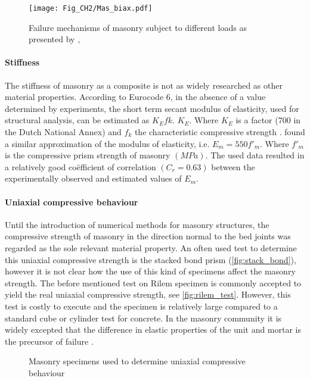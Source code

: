 \begin{figure}[!htb]
    \centering
    \texttt{[image: Fig\_CH2/Mas\_biax.pdf]}
    \caption{Failure mechanisms of masonry subject to different loads as presented by \citet{Mersch2015}, \cite{Dhanasekar1985}}
    \label{fig:Mas_biax}
\end{figure}

\paragraph{Stiffness}
The stiffness of masonry as a composite is not as widely researched as other material properties. According to Eurocode 6, in the absence of a value determined by experiments, the short term secant modulus of elasticity, used for structural analysis, can be estimated as $K_{E}f{k}$. $K_{E}$. Where $K_{E}$ is a factor (700 in the Dutch National Annex) and $f_{k}$ the characteristic compressive strength \cite[\S 3.7.2]{en1996}. \citet{kaushik2007} found a similar approximation of the modulus of elasticity, i.e. $E_{m}=550f'_{m}$. Where $f'_{m}$ is the compressive prism strength of masonry $(MPa)$. The used data resulted in a relatively good co\"{e}fficient of correlation $(C_{r}=0.63)$ between the experimentally observed and estimated values of $E_{m}$.

\paragraph{Uniaxial compressive behaviour}
Until the introduction of numerical methods for masonry structures, the compressive strength of masonry in the direction normal to the bed joints was regarded as the sole relevant material property. An often used test to determine this uniaxial compressive strength is the stacked bond prism (\autoref{fig:stack_bond}), however it is not clear how the use of this kind of specimens affect the masonry strength. The before mentioned test on Rilem specimen is commonly accepted to yield the real uniaxial compressive strength, see \autoref{fig:rilem_test}. However, this test is costly to execute and the specimen is relatively large compared to a standard cube or cylinder test for concrete. In the masonry community it is widely excepted that the difference in elastic properties of the unit and mortar is the precursor of failure \cite{lourenco1996}.

\begin{figure}[!htb]
    \centering
     \hspace{3em}
    \caption{Masonry specimens used to determine uniaxial compressive behaviour \cite{lourenco1996}}
    \label{fig:Uniax_compr}
\end{figure}


